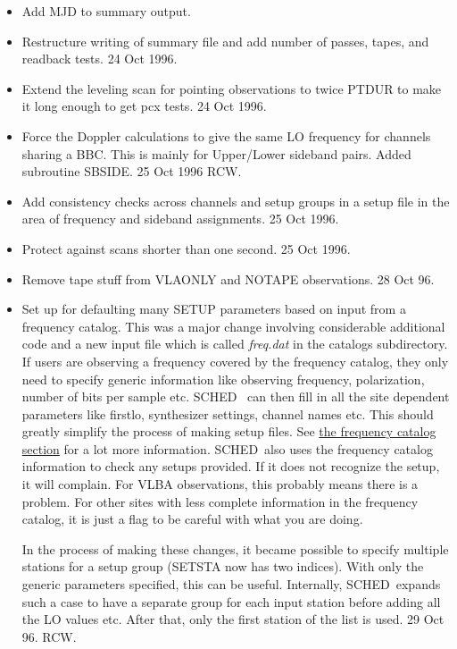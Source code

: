 \documentclass{report}
\newcommand{\schedb}{{\sc SCHED~}}
\begin{document}
\begin{itemize}
\item Add MJD to summary output.

\item Restructure writing of summary file and add number of passes,
      tapes, and readback tests.  24 Oct 1996.

\item Extend the leveling scan for pointing observations to twice
      PTDUR to make it long enough to get pcx tests.  24 Oct 1996.

\item Force the Doppler calculations to give the same LO frequency for
      channels sharing a BBC.  This is mainly for Upper/Lower
      sideband pairs.  Added subroutine SBSIDE. 25 Oct 1996 RCW.

\item Add consistency checks across channels and setup groups in
      a setup file in the area of frequency and sideband assignments.
      25 Oct 1996.

\item Protect against scans shorter than one second.  25 Oct 1996.

\item Remove tape stuff from VLAONLY and NOTAPE observations. 28 Oct 96.

\item Set up for defaulting many SETUP parameters based on input from
      a frequency catalog.  This was a major change involving
      considerable additional code and a new input file which is
      called {\sl freq.dat} in the catalogs subdirectory.  If users
      are observing a frequency covered by the frequency catalog, they
      only need to specify generic information like observing
      frequency, polarization, number of bits per sample etc.  \schedb
      can then fill in all the site dependent parameters like
      firstlo, synthesizer settings, channel names etc.  This
      should greatly simplify the process of making setup files.
      See
      \hyperref[SEC:FRQCAT]{the frequency catalog section}      
      for a lot more information.  \schedb also uses
      the frequency catalog information to check any setups provided.
      If it does not recognize the setup, it will complain.  For
      VLBA observations, this probably means there is a problem.
      For other sites with less complete information in the frequency
      catalog, it is just a flag to be careful with what you are
      doing.

      In the process of making these changes, it became possible to
      specify multiple stations for a setup group (SETSTA now has two
      indices).  With only the generic parameters specified, this
      can be useful.  Internally, \schedb expands such a case to
      have a separate group for each input station before adding
      all the LO values etc.  After that, only the first station
      of the list is used.      29 Oct 96.  RCW.


\end{itemize}
\end{document}
